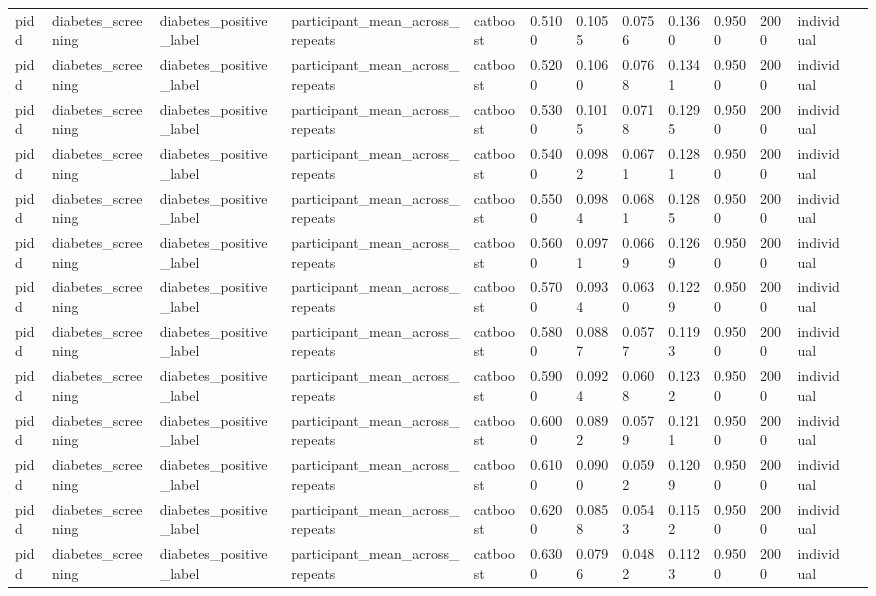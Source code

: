 \begin{tabular}{lllllllllllll}
pidd & diabetes\_screening & diabetes\_positive\_label & participant\_mean\_across\_repeats & catboost & 0.5100 & 0.1055 & 0.0756 & 0.1360 & 0.9500 & 2000 & individual &  \\
pidd & diabetes\_screening & diabetes\_positive\_label & participant\_mean\_across\_repeats & catboost & 0.5200 & 0.1060 & 0.0768 & 0.1341 & 0.9500 & 2000 & individual &  \\
pidd & diabetes\_screening & diabetes\_positive\_label & participant\_mean\_across\_repeats & catboost & 0.5300 & 0.1015 & 0.0718 & 0.1295 & 0.9500 & 2000 & individual &  \\
pidd & diabetes\_screening & diabetes\_positive\_label & participant\_mean\_across\_repeats & catboost & 0.5400 & 0.0982 & 0.0671 & 0.1281 & 0.9500 & 2000 & individual &  \\
pidd & diabetes\_screening & diabetes\_positive\_label & participant\_mean\_across\_repeats & catboost & 0.5500 & 0.0984 & 0.0681 & 0.1285 & 0.9500 & 2000 & individual &  \\
pidd & diabetes\_screening & diabetes\_positive\_label & participant\_mean\_across\_repeats & catboost & 0.5600 & 0.0971 & 0.0669 & 0.1269 & 0.9500 & 2000 & individual &  \\
pidd & diabetes\_screening & diabetes\_positive\_label & participant\_mean\_across\_repeats & catboost & 0.5700 & 0.0934 & 0.0630 & 0.1229 & 0.9500 & 2000 & individual &  \\
pidd & diabetes\_screening & diabetes\_positive\_label & participant\_mean\_across\_repeats & catboost & 0.5800 & 0.0887 & 0.0577 & 0.1193 & 0.9500 & 2000 & individual &  \\
pidd & diabetes\_screening & diabetes\_positive\_label & participant\_mean\_across\_repeats & catboost & 0.5900 & 0.0924 & 0.0608 & 0.1232 & 0.9500 & 2000 & individual &  \\
pidd & diabetes\_screening & diabetes\_positive\_label & participant\_mean\_across\_repeats & catboost & 0.6000 & 0.0892 & 0.0579 & 0.1211 & 0.9500 & 2000 & individual &  \\
pidd & diabetes\_screening & diabetes\_positive\_label & participant\_mean\_across\_repeats & catboost & 0.6100 & 0.0900 & 0.0592 & 0.1209 & 0.9500 & 2000 & individual &  \\
pidd & diabetes\_screening & diabetes\_positive\_label & participant\_mean\_across\_repeats & catboost & 0.6200 & 0.0858 & 0.0543 & 0.1152 & 0.9500 & 2000 & individual &  \\
pidd & diabetes\_screening & diabetes\_positive\_label & participant\_mean\_across\_repeats & catboost & 0.6300 & 0.0796 & 0.0482 & 0.1123 & 0.9500 & 2000 & individual &  \\

\end{tabular}
